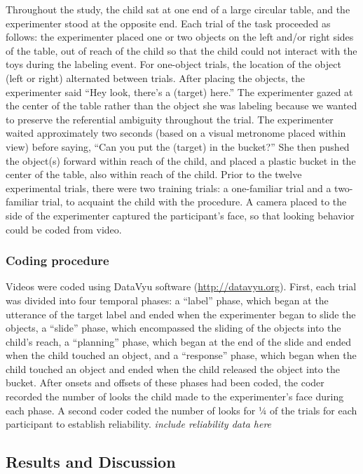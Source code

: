 \documentclass[10pt, letterpaper]{article}
\begin{document}
Throughout the study, the child sat at one end of a large circular
table, and the experimenter stood at the opposite end. Each trial of the
task proceeded as follows: the experimenter placed one or two objects on
the left and/or right sides of the table, out of reach of the child so
that the child could not interact with the toys during the labeling
event. For one-object trials, the location of the object (left or right)
alternated between trials. After placing the objects, the experimenter
said ``Hey look, there's a (target) here.'' The experimenter gazed at
the center of the table rather than the object she was labeling because
we wanted to preserve the referential ambiguity throughout the trial.
The experimenter waited approximately two seconds (based on a visual
metronome placed within view) before saying, ``Can you put the (target)
in the bucket?'' She then pushed the object(s) forward within reach of
the child, and placed a plastic bucket in the center of the table, also
within reach of the child. Prior to the twelve experimental trials,
there were two training trials: a one-familiar trial and a two-familiar
trial, to acquaint the child with the procedure. A camera placed to the
side of the experimenter captured the participant's face, so that
looking behavior could be coded from video.

\subsubsection{Coding procedure}\label{coding-procedure}

Videos were coded using DataVyu software (\url{http://datavyu.org}).
First, each trial was divided into four temporal phases: a ``label''
phase, which began at the utterance of the target label and ended when
the experimenter began to slide the objects, a ``slide'' phase, which
encompassed the sliding of the objects into the child's reach, a
``planning'' phase, which began at the end of the slide and ended when
the child touched an object, and a ``response'' phase, which began when
the child touched an object and ended when the child released the object
into the bucket. After onsets and offsets of these phases had been
coded, the coder recorded the number of looks the child made to the
experimenter's face during each phase. A second coder coded the number
of looks for ¼ of the trials for each participant to establish
reliability. \emph{include reliability data here}

\subsection{Results and Discussion}\label{results-and-discussion}
\end{document}
